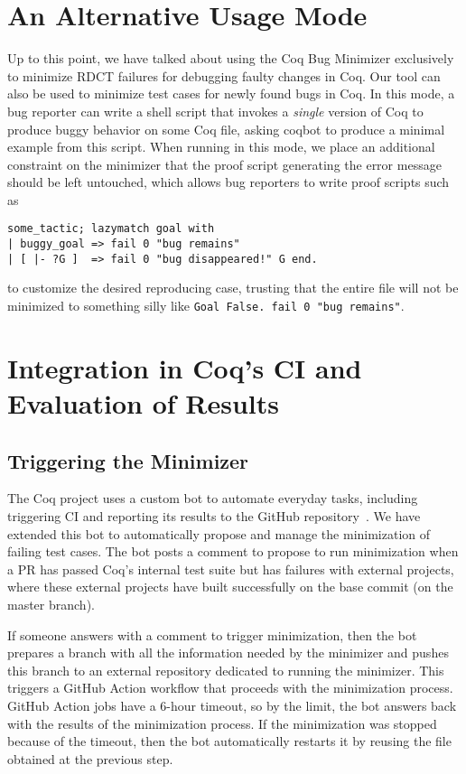\documentclass[a4paper,USenglish,cleveref,autoref,thm-restate,pdfa]{lipics-v2021}
\begin{document}
\section{An Alternative Usage Mode}\label{sec:alt-usage}

Up to this point, we have talked about using the Coq Bug Minimizer exclusively to minimize RDCT failures for debugging faulty changes in Coq.
Our tool can also be used to minimize test cases for newly found bugs in Coq.
In this mode, a bug reporter can write a shell script that invokes a \emph{single} version of Coq to produce buggy behavior on some Coq file, asking coqbot to produce a minimal example from this script.
When running in this mode, we place an additional constraint on the minimizer that the proof script generating the error message should be left untouched,
which allows bug reporters to write proof scripts such as
\begin{verbatim}
some_tactic; lazymatch goal with
| buggy_goal => fail 0 "bug remains"
| [ |- ?G ]  => fail 0 "bug disappeared!" G end.
\end{verbatim}
to customize the desired reproducing case, trusting that the entire file will not be minimized to something silly like \verb|Goal False. fail 0 "bug remains"|.





\section{Integration in Coq's CI and Evaluation of Results}\label{sec:evaluation}

\subsection{Triggering the Minimizer}

The Coq project uses a custom bot to automate everyday tasks, including triggering CI and reporting its results to the GitHub repository~\cite{zimmermann:hal-03479327}. We have extended this bot to automatically propose and manage the minimization of failing test cases. The bot posts a comment to propose to run minimization when a PR has passed Coq's internal test suite but has failures with external projects, where these external projects have built successfully on the base commit (on the master branch).

If someone answers with a comment to trigger minimization, then the bot prepares a branch with all the information needed by the minimizer and pushes this branch to an external repository dedicated to running the minimizer. This triggers a GitHub Action workflow that proceeds with the minimization process. GitHub Action jobs have a 6-hour timeout, so by the limit, the bot answers back with the results of the minimization process. If the minimization was stopped because of the timeout, then the bot automatically restarts it by reusing the file obtained at the previous step.
\end{document}
